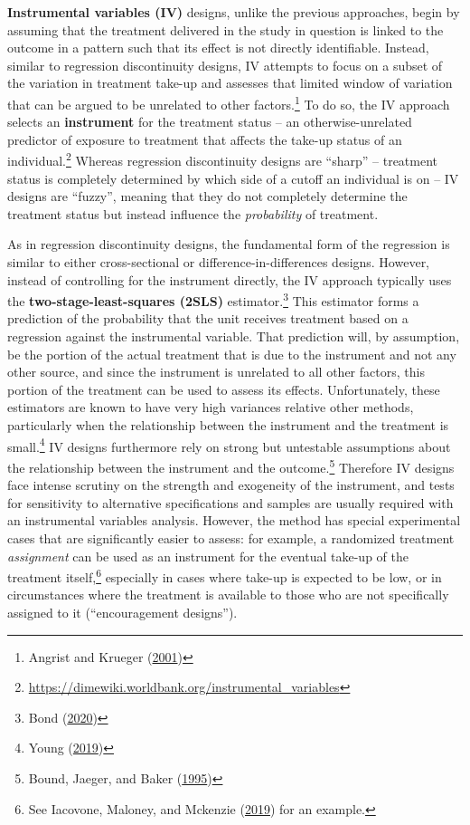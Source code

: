 \documentclass[
]{book}
\begin{document}
\textbf{Instrumental variables (IV)} designs, unlike the previous approaches,
begin by assuming that the treatment delivered in the study in question is
linked to the outcome in a pattern such that its effect is not directly identifiable.
Instead, similar to regression discontinuity designs,
IV attempts to focus on a subset of the variation in treatment take-up
and assesses that limited window of variation that can be argued
to be unrelated to other factors.\footnote{Angrist and Krueger (\protect\hyperlink{ref-angrist2001instrumental}{2001})}
To do so, the IV approach selects an \textbf{instrument}
for the treatment status -- an otherwise-unrelated predictor of exposure to treatment
that affects the take-up status of an individual.\footnote{\url{https://dimewiki.worldbank.org/instrumental_variables}}
Whereas regression discontinuity designs are ``sharp'' --
treatment status is completely determined by which side of a cutoff an individual is on --
IV designs are ``fuzzy'', meaning that they do not completely determine
the treatment status but instead influence the \emph{probability} of treatment.

As in regression discontinuity designs,
the fundamental form of the regression
is similar to either cross-sectional or difference-in-differences designs.
However, instead of controlling for the instrument directly,
the IV approach typically uses the \textbf{two-stage-least-squares (2SLS)} estimator.\footnote{Bond (\protect\hyperlink{ref-bond2020}{2020})}
This estimator forms a prediction of the probability that the unit receives treatment
based on a regression against the instrumental variable.
That prediction will, by assumption, be the portion of the actual treatment
that is due to the instrument and not any other source,
and since the instrument is unrelated to all other factors,
this portion of the treatment can be used to assess its effects.
Unfortunately, these estimators are known
to have very high variances relative other methods,
particularly when the relationship between the instrument and the treatment is small.\footnote{Young (\protect\hyperlink{ref-young2017consistency}{2019})}
IV designs furthermore rely on strong but untestable assumptions
about the relationship between the instrument and the outcome.\footnote{Bound, Jaeger, and Baker (\protect\hyperlink{ref-bound1995problems}{1995})}
Therefore IV designs face intense scrutiny on the strength and exogeneity of the instrument,
and tests for sensitivity to alternative specifications and samples
are usually required with an instrumental variables analysis.
However, the method has special experimental cases that are significantly easier to assess:
for example, a randomized treatment \emph{assignment} can be used as an instrument
for the eventual take-up of the treatment itself,\footnote{See Iacovone, Maloney, and Mckenzie (\protect\hyperlink{ref-iacovone2019improving}{2019}) for an example.}
especially in cases where take-up is expected to be low,
or in circumstances where the treatment is available
to those who are not specifically assigned to it (``encouragement designs'').
\end{document}
